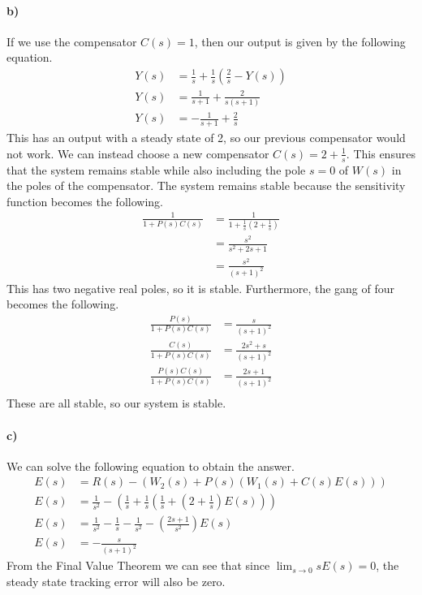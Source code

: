 \documentclass[12pt]{article}
\begin{document}
\paragraph{b)}

If we use the compensator \(C(s)=1\), then our output is given by the following equation.
\begin{align*}
    Y(s)&=\frac{1}{s} + \frac{1}{s}\left(\frac{2}{s}-Y(s)\right)\\
    Y(s)&=\frac{1}{s+1}+\frac{2}{s(s+1)}\\
    Y(s)&=-\frac{1}{s+1}+\frac{2}{s}
\end{align*}
This has an output with a steady state of 2, so our previous compensator would not work.
We can instead choose a new compensator \(C(s)=2+\frac{1}{s}\). This ensures that
the system remains stable while also including the pole \(s=0\) of \(W(s)\) in the poles
of the compensator. The system remains stable because the sensitivity function
becomes the following.
\begin{align*}
    \frac{1}{1+P(s)C(s)}&=\frac{1}{1+\frac{1}{s}\left(2+\frac{1}{s}\right)}\\
    &=\frac{s^2}{s^2+2s+1}\\
    &=\frac{s^2}{(s+1)^2}
\end{align*}
This has two negative real poles, so it is stable. Furthermore, the gang of four becomes
the following.
\begin{align*}
    \frac{P(s)}{1+P(s)C(s)}&=\frac{s}{(s+1)^2}\\
    \frac{C(s)}{1+P(s)C(s)}&=\frac{2s^2+s}{(s+1)^2}\\
    \frac{P(s)C(s)}{1+P(s)C(s)}&=\frac{2s+1}{(s+1)^2}\\
\end{align*}
These are all stable, so our system is stable.

\paragraph{c)}

We can solve the following equation to obtain the answer.
\begin{align*}
    E(s)&=R(s)-(W_2(s)+P(s)(W_1(s)+C(s)E(s)))\\
    E(s)&=\frac{1}{s^2}-\left(\frac{1}{s}+\frac{1}{s}\left(\frac{1}{s}+\left(2+\frac{1}{s}\right)E(s)\right)\right)\\
    E(s)&=\frac{1}{s^2}-\frac{1}{s}-\frac{1}{s^2}-\left(\frac{2s+1}{s^2}\right)E(s)\\
    E(s)&=-\frac{s}{(s+1)^2}
\end{align*}
From the Final Value Theorem we can see that since \(\lim_{s\to0} sE(s)=0\), the steady state tracking
error will also be zero.
\end{document}
